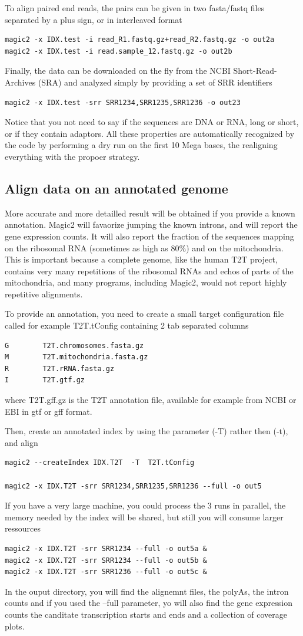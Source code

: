 \documentclass[11pt]{article}
\newcommand{\BL}{\begin{lstlisting}}
\begin{document}
To align paired end reads, the pairs can be given in two fasta/fastq files
separated by a plus sign, 
or in interleaved format
\BL
magic2 -x IDX.test -i read_R1.fastq.gz+read_R2.fastq.gz -o out2a
magic2 -x IDX.test -i read.sample_12.fastq.gz -o out2b
\end{lstlisting}

Finally, the data can be downloaded on the fly from the NCBI Short-Read-Archives (SRA)
and analyzed simply by providing a set of SRR identifiers

\BL
magic2 -x IDX.test -srr SRR1234,SRR1235,SRR1236 -o out23
\end{lstlisting}

Notice that you not need to say if the sequences are DNA or RNA, long or short, or if they
contain adaptors. All these properties are automatically recognized by the code by performing a dry
run on the first 10 Mega bases, the realigning everything with the propoer strategy.

\subsection {Align data on an annotated genome}

More accurate and more detailled result will be obtained if you provide a known annotation.
Magic2 will favaorize jumping the known introns, and will report the gene expression counts.
It will also report the fraction of the sequences mapping on the ribosomal RNA (sometimes as high as 80\%)
and on the mitochondria. This is important because a complete genome, like the human T2T project,
contains very many repetitions of the ribosomal RNAs and echos of parts of the mitochondria,
and many programs, including Magic2, would not report highly repetitive alignments.

To provide an annotation, you need to create a small target configuration file
called for example T2T.tConfig  containing 2 tab separated columns
\BL
G        T2T.chromosomes.fasta.gz
M        T2T.mitochondria.fasta.gz
R        T2T.rRNA.fasta.gz
I        T2T.gtf.gz
\end{lstlisting}
where T2T.gff.gz is the T2T annotation file, available for example from
NCBI or EBI in gtf or gff format.

Then, create an annotated index by using the parameter (-T) rather then (-t), and align
\BL
magic2 --createIndex IDX.T2T  -T  T2T.tConfig

magic2 -x IDX.T2T -srr SRR1234,SRR1235,SRR1236 --full -o out5
\end{lstlisting}
If you have a very large machine, you could process the 3 runs in parallel,
the memory needed by the index will be shared, but still you will consume larger ressources
\BL
magic2 -x IDX.T2T -srr SRR1234 --full -o out5a &
magic2 -x IDX.T2T -srr SRR1234 --full -o out5b &
magic2 -x IDX.T2T -srr SRR1236 --full -o out5c &
\end{lstlisting}
In the ouput directory, you will find the alignemnt files, the polyAs, the intron counts
and if you used the --full parameter, yo will also find the gene expression counts
the canditate transcription starts and ends and a collection of coverage plots.
\end{document}
